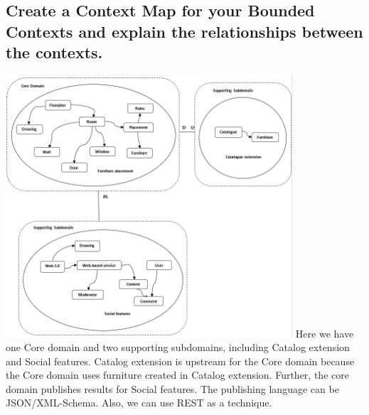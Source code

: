 		\subsection{Create a Context Map for your Bounded Contexts and explain the relationships
			between the contexts.}
			\includegraphics[keepaspectratio,width=0.8\textwidth,angle=0]{images/ddd4.PNG}
			\newline
			Here we have one Core domain and two supporting subdomains, including Catalog extension and Social features.
            Catalog extension is upstream for the Core domain because the Core domain uses furniture created in Catalog extension.
            Further, the core domain publishes results for Social features. The publishing language can be JSON/XML-Schema. Also, we can use REST as a technique.
